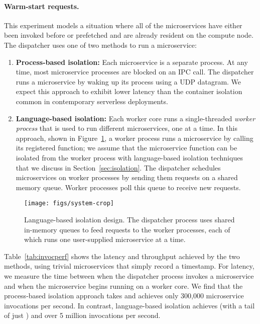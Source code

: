 \paragraph{Warm-start requests.}
This experiment models a situation where all of the microservices have either been
invoked before or prefetched and are already resident on the compute node.  The
dispatcher uses one of two methods to run a microservice:

\begin{enumerate}
\item \textbf{Process-based isolation:} Each microservice is a separate process.
At any time, most microservice processes are blocked on an IPC
call. The dispatcher runs a microservice by waking up its process using a UDP datagram.
We expect this approach to exhibit lower latency than the container isolation common
in contemporary serverless deployments.
\item \textbf{Language-based isolation:} Each worker core runs a single-threaded
\emph{worker process} that is used to run different microservices, one at a time.
In this approach, shown in Figure~\ref{fig:sysdesign}, a worker process runs a
microservice by calling its registered
function; we assume that the microservice function can be isolated from the
worker process with language-based isolation techniques that we discuss in
Section~\ref{sec:isolation}. The dispatcher schedules microservices on worker
processes by sending them
requests on a shared memory queue. Worker processes poll this queue to receive
new requests.
\end{enumerate}

\begin{figure}
\texttt{[image: figs/system-crop]}
\caption{Language-based isolation design.  The dispatcher process
uses shared in-memory queues to feed requests to the worker processes, each of
which runs one user-supplied microservice at a time.}
\label{fig:sysdesign}
\end{figure}

Table~\ref{tab:invocperf} shows the latency and throughput achieved
by the two methods, using trivial microservices that simply record a timestamp. For
latency, we measure the time between when the dispatcher
process invokes a microservice and when the microservice begins
running on a worker core. We find that the process-based isolation approach
takes  and achieves only 300,000 microservice invocations per
second. In contrast, language-based isolation achieves  (with a tail
of just ) and over 5 million invocations per second.

